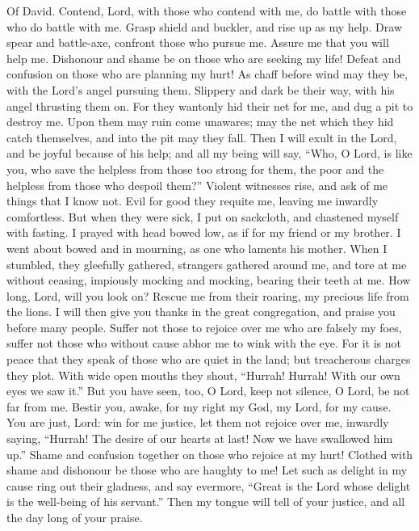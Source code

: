 Of David.  Contend, Lord, with those who contend with me, do
battle with those who do battle with me.  Grasp shield and
buckler, and rise up as my help.  Draw spear and battle-axe,
confront those who pursue me. Assure me that you will help me.
 Dishonour and shame be on those who are seeking my life!
Defeat and confusion on those who are planning my hurt!  As
chaff before wind may they be, with the Lord's angel pursuing them.
 Slippery and dark be their way, with his angel thrusting
them on.  For they wantonly hid their net for me, and dug a
pit to destroy me.  Upon them may ruin come unawares; may
the net which they hid catch themselves, and into the pit may they fall.
 Then I will exult in the Lord, and be joyful because of his
help;  and all my being will say, ``Who, O Lord, is like
you, who save the helpless from those too strong for them, the poor and
the helpless from those who despoil them?''  Violent
witnesses rise, and ask of me things that I know not.  Evil
for good they requite me, leaving me inwardly comfortless. 
But when they were sick, I put on sackcloth, and chastened myself with
fasting. I prayed with head bowed low,  as if for my friend
or my brother. I went about bowed and in mourning, as one who laments
his mother.  When I stumbled, they gleefully gathered,
strangers gathered around me, and tore at me without ceasing,
 impiously mocking and mocking, bearing their teeth at me.
 How long, Lord, will you look on? Rescue me from their
roaring, my precious life from the lions.  I will then give
you thanks in the great congregation, and praise you before many people.
 Suffer not those to rejoice over me who are falsely my
foes, suffer not those who without cause abhor me to wink with the eye.
 For it is not peace that they speak of those who are quiet
in the land; but treacherous charges they plot.  With wide
open mouths they shout, ``Hurrah! Hurrah! With our own eyes we saw it.''
 But you have seen, too, O Lord, keep not silence, O Lord,
be not far from me.  Bestir you, awake, for my right my
God, my Lord, for my cause.  You are just, Lord: win for me
justice, let them not rejoice over me,  inwardly saying,
``Hurrah! The desire of our hearts at last! Now we have swallowed him
up.''  Shame and confusion together on those who rejoice at
my hurt! Clothed with shame and dishonour be those who are haughty to
me!  Let such as delight in my cause ring out their
gladness, and say evermore, ``Great is the Lord whose delight is the
well-being of his servant.''  Then my tongue will tell of
your justice, and all the day long of your praise.

